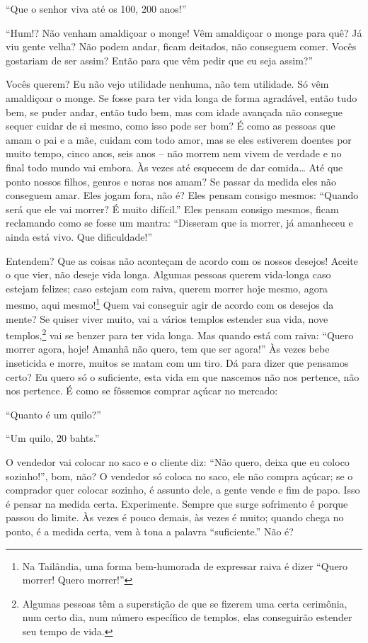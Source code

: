 “Que o senhor viva até os 100, 200 anos!” 

“Hum!? Não venham amaldiçoar o monge! Vêm amaldiçoar o monge para
quê? Já viu gente velha? Não podem andar, ficam deitados, não conseguem
comer. Vocês gostariam de ser assim? Então para que vêm pedir que eu
seja assim?”

Vocês querem? Eu não vejo utilidade nenhuma, não tem utilidade. Só
vêm amaldiçoar o monge. Se fosse para ter vida longa de forma
agradável, então tudo bem, se puder andar, então tudo bem, mas com
idade avançada não consegue sequer cuidar de si mesmo, como isso pode
ser bom? É como as pessoas que amam o pai e a mãe, cuidam com todo
amor, mas se eles estiverem doentes por muito tempo, cinco anos, seis
anos – não morrem nem vivem de verdade e no final todo mundo vai
embora. Às vezes até esquecem de dar comida\ldots{} Até que ponto nossos
filhos, genros e noras nos amam? Se passar da medida eles não conseguem
amar. Eles jogam fora, não é? Eles pensam consigo mesmos: “Quando será
que ele vai morrer? É muito difícil.” Eles pensam consigo mesmos, ficam
reclamando como se fosse um mantra: “Disseram que ia morrer, já
amanheceu e ainda está vivo. Que dificuldade!”

Entendem? Que as coisas não aconteçam de acordo com os nossos
desejos! Aceite o que vier, não deseje vida longa. Algumas pessoas
querem vida-longa caso estejam felizes; caso estejam com raiva, querem
morrer hoje mesmo, agora mesmo, aqui mesmo!\footnote{Na Tailândia, uma
forma bem-humorada de expressar raiva é dizer “Quero morrer! Quero
morrer!”} Quem vai conseguir agir de acordo com os desejos da mente?
Se quiser viver muito, vai a vários templos estender sua vida, nove
templos,\footnote{Algumas pessoas têm a superstição de que se fizerem
uma certa cerimônia, num certo dia, num número específico de templos,
elas conseguirão estender seu tempo de vida.} vai se benzer para ter
vida longa. Mas quando está com raiva: “Quero morrer agora, hoje!
Amanhã não quero, tem que ser agora!” Às vezes bebe inseticida e morre,
muitos se matam com um tiro. Dá para dizer que pensamos certo? Eu quero
só o suficiente, esta vida em que nascemos não nos pertence, não nos
pertence. É como se fôssemos comprar açúcar no mercado:

“Quanto é um quilo?”

“Um quilo, 20 bahts.”

O vendedor vai colocar no saco e o cliente diz: “Não quero, deixa
que eu coloco sozinho!”, bom, não? O vendedor só coloca no saco, ele
não compra açúcar; se o comprador quer colocar sozinho, é assunto dele,
a gente vende e fim de papo. Isso é pensar na medida certa.
Experimente. Sempre que surge sofrimento é porque passou do limite. Às
vezes é pouco demais, às vezes é muito; quando chega no ponto, é a
medida certa, vem à tona a palavra “suficiente.” Não é?


